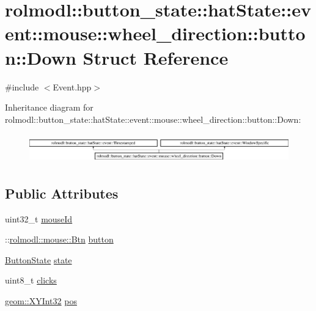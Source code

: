 \hypertarget{structrolmodl_1_1button__state_1_1hat_state_1_1event_1_1mouse_1_1wheel__direction_1_1button_1_1_down}{}\section{rolmodl\+::button\+\_\+state\+::hat\+State\+::event\+::mouse\+::wheel\+\_\+direction\+::button\+::Down Struct Reference}
\label{structrolmodl_1_1button__state_1_1hat_state_1_1event_1_1mouse_1_1wheel__direction_1_1button_1_1_down}


{\ttfamily \#include $<$Event.\+hpp$>$}

Inheritance diagram for rolmodl\+::button\+\_\+state\+::hat\+State\+::event\+::mouse\+::wheel\+\_\+direction\+::button\+::Down\+:\begin{figure}[H]
\begin{center}
\leavevmode
\includegraphics[height=1.281464cm]{structrolmodl_1_1button__state_1_1hat_state_1_1event_1_1mouse_1_1wheel__direction_1_1button_1_1_down}
\end{center}
\end{figure}
\subsection*{Public Attributes}
\begin{DoxyCompactItemize}
\item 
uint32\+\_\+t \mbox{\hyperlink{structrolmodl_1_1button__state_1_1hat_state_1_1event_1_1mouse_1_1wheel__direction_1_1button_1_1_down_adf5352f25ed3be21b260bbaa8dd605e9}{mouse\+Id}}
\item 
\+::\mbox{\hyperlink{namespacerolmodl_1_1rolmodl_1_1mouse_a5ed523191c7ec81f6e69f02b9a616ebf}{rolmodl\+::mouse\+::\+Btn}} \mbox{\hyperlink{structrolmodl_1_1button__state_1_1hat_state_1_1event_1_1mouse_1_1wheel__direction_1_1button_1_1_down_ac6c76c8a31b4b7fb6dba7f9236dde275}{button}}
\item 
\mbox{\hyperlink{namespacerolmodl_ad08ec5c56aa1db118f871357b2d475fd}{Button\+State}} \mbox{\hyperlink{structrolmodl_1_1button__state_1_1hat_state_1_1event_1_1mouse_1_1wheel__direction_1_1button_1_1_down_a7be0f6e3e39c8d81ebc50f6e3b5eca10}{state}}
\item 
uint8\+\_\+t \mbox{\hyperlink{structrolmodl_1_1button__state_1_1hat_state_1_1event_1_1mouse_1_1wheel__direction_1_1button_1_1_down_aaefcc0b8ba9a28811a91d7b462aff7ff}{clicks}}
\item 
\mbox{\hyperlink{structrolmodl_1_1geom_1_1_x_y_int32}{geom\+::\+X\+Y\+Int32}} \mbox{\hyperlink{structrolmodl_1_1button__state_1_1hat_state_1_1event_1_1mouse_1_1wheel__direction_1_1button_1_1_down_a1b47052c9a72ff58ada4e7aaf9086c97}{pos}}
\end{DoxyCompactItemize}


